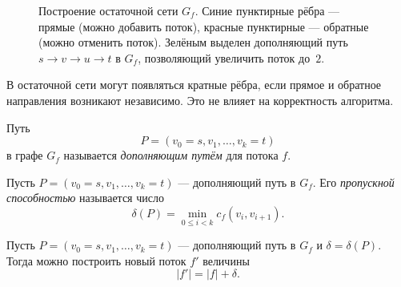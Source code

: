 \begin{figure}[htb]
	\caption{Построение остаточной сети $G_f$.
		Синие пунктирные рёбра --- прямые (можно добавить поток),
		красные пунктирные --- обратные (можно отменить поток).
		Зелёным выделен дополняющий путь $s\to v\to u\to t$ в $G_f$,
		позволяющий увеличить поток до~$2$.}
	\label{fig:residual}
\end{figure}

\begin{Remark}{}{}
	В остаточной сети могут появляться кратные рёбра, если прямое и обратное направления возникают независимо. Это не влияет на корректность алгоритма.
\end{Remark}

\begin{Definition}{}{}
	Путь
	\[
	P=(v_0=s,v_1,\dots,v_k=t)
	\]
	в графе $G_f$ называется \emph{дополняющим путём} для потока $f$.
\end{Definition}

\begin{Definition}{}{}
	Пусть $P=(v_0=s,v_1,\dots,v_k=t)$ --- дополняющий путь в $G_f$. Его \emph{пропускной способностью} называется число
	\[
	\delta(P)=\min_{0\le i<k} c_f(v_i,v_{i+1}).
	\]
\end{Definition}

\begin{Proposition}{}{}
	Пусть $P=(v_0=s,v_1,\dots,v_k=t)$ --- дополняющий путь в $G_f$ и $\delta=\delta(P)$. Тогда можно построить новый поток $f'$ величины
	\[
	|f'|=|f|+\delta.
	\]
\end{Proposition}

